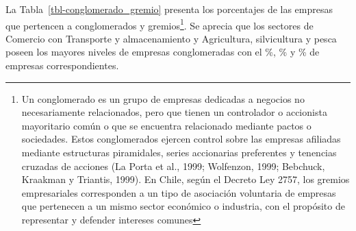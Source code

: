 \documentclass[
  11pt,
]{article}
\begin{document}
\begin{table}

\caption{\label{tbl-subcontratos_region}Distribución regional de
Empresas que Operan mediante Subcontratación}


\end{table}%

La Tabla~\ref{tbl-conglomerado_gremio} presenta los porcentajes de las
empresas que pertencen a conglomerados y gremios\footnote{Un
  conglomerado es un grupo de empresas dedicadas a negocios no
  necesariamente relacionados, pero que tienen un controlador o
  accionista mayoritario común o que se encuentra relacionado mediante
  pactos o sociedades. Estos conglomerados ejercen control sobre las
  empresas afiliadas mediante estructuras piramidales, series
  accionarias preferentes y tenencias cruzadas de acciones (La Porta et
  al., 1999; Wolfenzon, 1999; Bebchuck, Kraakman y Triantis, 1999). En
  Chile, según el Decreto Ley 2757, los gremios empresariales
  corresponden a un tipo de asociación voluntaria de empresas que
  pertenecen a un mismo sector económico o industria, con el propósito
  de representar y defender intereses comunes}. Se aprecia que los
sectores de Comercio con Transporte y almacenamiento y Agricultura,
silvicultura y pesca poseen los mayores niveles de empresas
conglomeradas con el \%, \% y \% de
empresas correspondientes.
\end{document}
